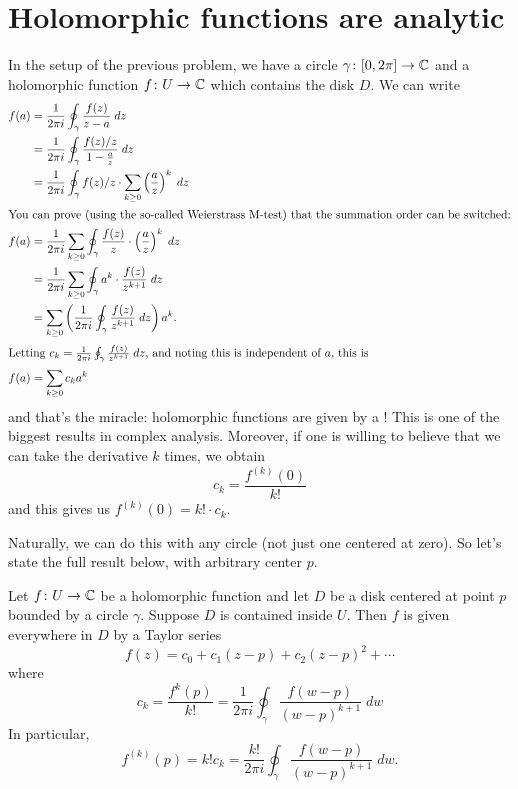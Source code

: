 \section{Holomorphic functions are analytic}
In the setup of the previous problem, we have a circle $\gamma \colon [0,2\pi] \to \mathbb C$
and a holomorphic function $f \colon U \to \mathbb C$ which contains the disk $D$.
We can write
\begin{align*}
	f(a) &= \frac{1}{2\pi i} \oint_\gamma \frac{f(z)}{z-a} \; dz \\
	&= \frac{1}{2\pi i} \oint_\gamma \frac{f(z)/z}{1 - \frac az} \; dz \\
	&= \frac{1}{2\pi i} \oint_\gamma f(z)/z \cdot \sum_{k \ge 0} \left( \frac az \right)^k \; dz \\
	\intertext{You can prove (using the so-called Weierstrass M-test) that the summation order can be switched:}
	f(a) &= \frac{1}{2\pi i} \sum_{k \ge 0} \oint_\gamma \frac{f(z)}{z} \cdot \left( \frac az \right)^k \; dz \\
	&= \frac{1}{2\pi i} \sum_{k \ge 0} \oint_\gamma a^k \cdot \frac{f(z)}{z^{k+1}} \; dz \\
	&=  \sum_{k \ge 0} \left( \frac{1}{2\pi i}\oint_\gamma \frac{f(z)}{z^{k+1}} \; dz \right) a^k. \\
	\intertext{Letting
		$c_k =  \frac{1}{2\pi i}\oint_\gamma \frac{f(z)}{z^{k+1}} \; dz$,
		and noting this is independent of $a$, this is}
	f(a) &= \sum_{k \ge 0} c_k a^k
\end{align*}
and that's the miracle: holomorphic functions
are given by a !
This is one of the biggest results in complex analysis.
Moreover, if one is willing to believe that we can
take the derivative $k$ times, we obtain
\[ c_k = \frac{f^{(k)}(0)}{k!} \]
and this gives us $f^{(k)}(0) = k! \cdot c_k$.

Naturally, we can do this with any circle (not just one centered at zero).
So let's state the full result below, with arbitrary center $p$.

\begin{theorem}
	Let $f \colon U \to \mathbb C$ be a holomorphic function and let $D$ be a disk centered at point $p$
	bounded by a circle $\gamma$.  Suppose $D$ is contained inside $U$.
	Then $f$ is given everywhere in $D$ by a Taylor series
	\[
		f(z) = c_0 + c_1(z-p) + c_2(z-p)^2 + \cdots
	\]
	where
	\[
		c_k = \frac{f^{k}(p)}{k!} = \frac{1}{2\pi i} \oint_\gamma \frac{f(w-p)}{(w-p)^{k+1}} \; dw
	\]
	In particular,
	\[ f^{(k)}(p) = k! c_k = \frac{k!}{2\pi i} \oint_\gamma \frac{f(w-p)}{(w-p)^{k+1}} \; dw. \]
\end{theorem}

